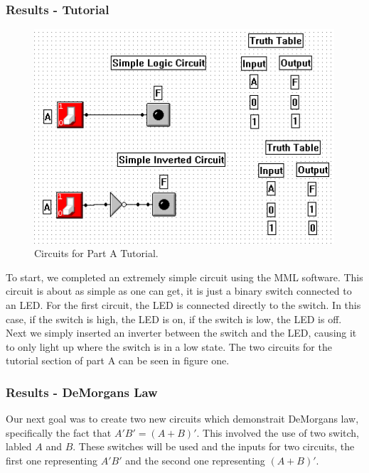\documentclass[a4paper,11pt]{article}
\begin{document}
\subsubsection{Results - Tutorial} 
 \begin{figure}
     \includegraphics[width=4.4in]{PartACircuit}
   \caption{Circuits for Part A Tutorial.}
   \label{fig:tutorial}
\end{figure} 
To start, we completed an extremely simple circuit using the MML software. This circuit is about as simple as one can get, it is just a binary switch connected to an LED. For the first circuit, the LED is connected directly to the switch. In this case, if the switch is high, the LED is on, if the switch is low, the LED is off. Next we simply inserted an inverter between the switch and the LED, causing it to only light up where the switch is in a low state. The two circuits for the tutorial section of part A can be seen in figure one. \\

\subsubsection{Results - DeMorgans Law} 
Our next goal was to create two new circuits which demonstrait DeMorgans law, specifically the fact that \(A'B' = (A+B)'\). This involved the use of two switch, labled $A$ and $B$. These switches will be used and the inputs for two circuits, the first one representing $A'B'$ and the second one representing $(A+B)'$.
\end{document}
